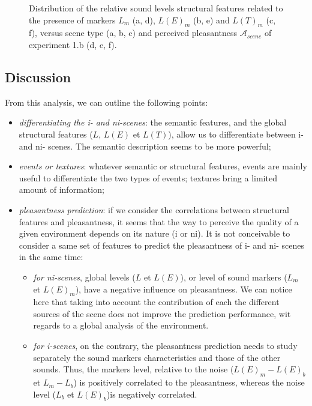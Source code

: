 \documentclass[twoside,twocolumn]{article}
\begin{document}
\begin{figure}[t]
        \caption{Distribution of the relative sound levels structural features related to the presence of markers $L_m$ (a, d), $L(E)_m$ (b, e) and $L(T)_m$ (c, f), versus scene type (a, b, c) and perceived pleasantness $\mathcal{A}_{scene}$ of experiment 1.b (d, e, f).}\label{fig:soundlevelMarker}
\end{figure}

\subsection{Discussion}

From this analysis, we can outline the following points:

\begin{itemize}
\item \emph{differentiating the i- and ni-scenes}: the semantic features, and the global structural features ($L$, $L(E)$ et $L(T)$), allow us to differentiate between i- and ni- scenes. The semantic description seems to be more powerful;
\item \emph{events or textures}: whatever semantic or structural features, events are mainly useful to differentiate the two types of events; textures bring a limited amount of information;
\item \emph{pleasantness prediction}: if we consider the correlations between structural features and pleasantness, it seems that the way to perceive the quality of a given environment depends on its nature (i or ni). It is not conceivable to consider a same set of features to predict the pleasantness of i- and ni- scenes in the same time:

\begin{itemize}

\item \emph{for ni-scenes}, global levels ($L$ et $L(E)$), or level of sound markers ($L_m$ et $L(E)_{m}$), have a negative influence on pleasantness. We can notice here that taking into account the contribution of each the different sources of the scene does not improve the prediction performance, wit regards to a global analysis of the environment.

\item \emph{for i-scenes}, on the contrary, the pleasantness prediction needs to study separately the sound markers characteristics and those of the other sounds. Thus, the markers level, relative to the noise ($L(E)_m-L(E)_b$ et $L_m-L_b$) is positively correlated to the pleasantness, whereas the noise level ($L_b$ et $L(E)_b$)is negatively correlated.
\end{itemize}
\end{itemize}
\end{document}
